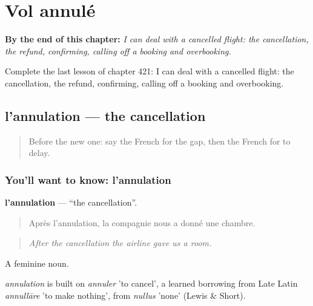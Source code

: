 
\chapter{Vol annulé}
\label{ch:fr-vol-annule}

\begin{chapteropening}
\textbf{By the end of this chapter:} \emph{I can deal with a cancelled flight: the cancellation, the refund, confirming, calling off a booking and overbooking.}

Complete the last lesson of chapter 421: I can deal with a cancelled flight: the cancellation, the refund, confirming, calling off a booking and overbooking.
\end{chapteropening}

\section[l'annulation]{l'annulation — the cancellation}

\label{lesson:FR-C421-annulation}



\begin{quote}
Before the new one: say the French for the gap, then the French for to delay.
\end{quote}

\subsection*{You'll want to know: l'annulation}
\textbf{l'annulation} — \textquotedblleft{}the cancellation\textquotedblright{}.

\begin{quote}
Après l'annulation, la compagnie nous a donné une chambre.
\end{quote}

\begin{quote}
\emph{After the cancellation the airline gave us a room.}
\end{quote}

A feminine noun.

\begin{cousinweb}
\emph{annulation} is built on \emph{annuler} 'to cancel', a learned borrowing from Late Latin \emph{annullāre} 'to make nothing', from \emph{nullus} 'none' (Lewis \& Short).
\end{cousinweb}

